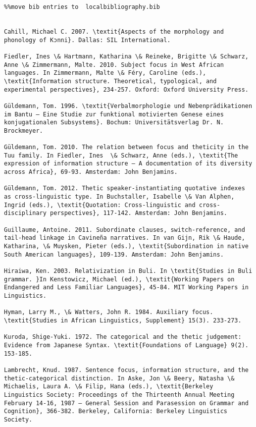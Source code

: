 \documentclass[output=paper]{langsci/langscibook}
\begin{document}
\begin{verbatim}%%move bib entries to  localbibliography.bib


Cahill, Michael C. 2007. \textit{Aspects of the morphology and phonology of Kɔnni}. Dallas: SIL International.

Fiedler, Ines \& Hartmann, Katharina \& Reineke, Brigitte \& Schwarz, Anne \& Zimmermann, Malte. 2010. Subject focus in West African languages. In Zimmermann, Malte \& Féry, Caroline (eds.), \textit{Information structure. Theoretical, typological, and experimental perspectives}, 234-257. Oxford: Oxford University Press.

Güldemann, Tom. 1996. \textit{Verbalmorphologie und Nebenprädikationen im Bantu – Eine Studie zur funktional motivierten Genese eines konjugationalen Subsystems}. Bochum: Universitätsverlag Dr. N. Brockmeyer.

Güldemann, Tom. 2010. The relation between focus and theticity in the Tuu family. In Fiedler, Ines  \& Schwarz, Anne (eds.), \textit{The expression of information structure – A documentation of its diversity across Africa}, 69-93. Amsterdam: John Benjamins.

Güldemann, Tom. 2012. Thetic speaker-instantiating quotative indexes as cross-linguistic type. In Buchstaller, Isabelle \& Van Alphen, Ingrid (eds.), \textit{Quotation: Cross-linguistic and cross-disciplinary perspectives}, 117-142. Amsterdam: John Benjamins.

Guillaume, Antoine. 2011. Subordinate clauses, switch-reference, and tail-head linkage in Cavineña narratives. In van Gijn, Rik \& Haude, Katharina, \& Muysken, Pieter (eds.), \textit{Subordination in native South American languages}, 109-139. Amsterdam: John Benjamins.

Hiraiwa, Ken. 2003. Relativization in Buli. In \textit{Studies in Buli grammar. }In Kenstowicz, Michael (ed.), \textit{Working Papers on Endangered and Less Familiar Languages}, 45-84. MIT Working Papers in Linguistics.

Hyman, Larry M., \& Watters, John R. 1984. Auxiliary focus. \textit{Studies in African Linguistics, Supplement} 15(3). 233-273.

Kuroda, Shige-Yuki. 1972. The categorical and the thetic judgement: Evidence from Japanese Syntax. \textit{Foundations of Language} 9(2). 153-185.

Lambrecht, Knud. 1987. Sentence focus, information structure, and the thetic-categorical distinction. In Aske, Jon \& Beery, Natasha \& Michaelis, Laura A. \& Filip, Hana (eds.), \textit{Berkeley Linguistics Society: Proceedings of the Thirteenth Annual Meeting February 14-16, 1987 – General Session and Parasession on Grammar and Cognition}, 366-382. Berkeley, California: Berkeley Linguistics Society.


\end{verbatim}
\end{document}

